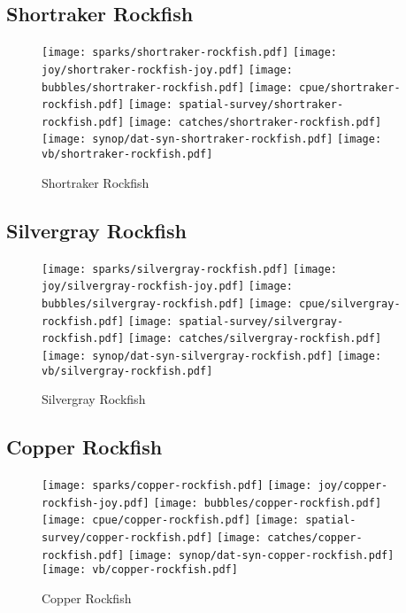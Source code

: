 \subsection*{Shortraker Rockfish}

\begin{figure}[htbp]
\centering
\texttt{[image: sparks/shortraker-rockfish.pdf]}
\texttt{[image: joy/shortraker-rockfish-joy.pdf]}
\texttt{[image: bubbles/shortraker-rockfish.pdf]}
\texttt{[image: cpue/shortraker-rockfish.pdf]}
\texttt{[image: spatial-survey/shortraker-rockfish.pdf]}
\texttt{[image: catches/shortraker-rockfish.pdf]}
\texttt{[image: synop/dat-syn-shortraker-rockfish.pdf]}
\texttt{[image: vb/shortraker-rockfish.pdf]}
\caption{Shortraker Rockfish}
\end{figure}
\clearpage
\subsection*{Silvergray Rockfish}

\begin{figure}[htbp]
\centering
\texttt{[image: sparks/silvergray-rockfish.pdf]}
\texttt{[image: joy/silvergray-rockfish-joy.pdf]}
\texttt{[image: bubbles/silvergray-rockfish.pdf]}
\texttt{[image: cpue/silvergray-rockfish.pdf]}
\texttt{[image: spatial-survey/silvergray-rockfish.pdf]}
\texttt{[image: catches/silvergray-rockfish.pdf]}
\texttt{[image: synop/dat-syn-silvergray-rockfish.pdf]}
\texttt{[image: vb/silvergray-rockfish.pdf]}
\caption{Silvergray Rockfish}
\end{figure}
\clearpage
\subsection*{Copper Rockfish}

\begin{figure}[htbp]
\centering
\texttt{[image: sparks/copper-rockfish.pdf]}
\texttt{[image: joy/copper-rockfish-joy.pdf]}
\texttt{[image: bubbles/copper-rockfish.pdf]}
\texttt{[image: cpue/copper-rockfish.pdf]}
\texttt{[image: spatial-survey/copper-rockfish.pdf]}
\texttt{[image: catches/copper-rockfish.pdf]}
\texttt{[image: synop/dat-syn-copper-rockfish.pdf]}
\texttt{[image: vb/copper-rockfish.pdf]}
\caption{Copper Rockfish}
\end{figure}
\clearpage
